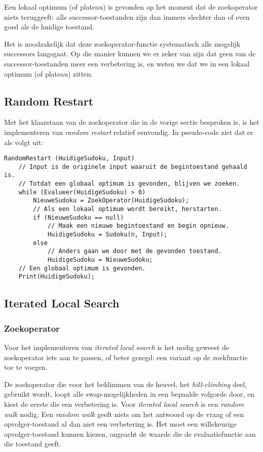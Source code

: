 \documentclass[]{report}
\begin{document}
Een lokaal optimum (of plateau) is gevonden op het moment dat de zoekoperator niets teruggeeft: alle successor-toestanden zijn dan immers slechter dan of even goed als de huidige toestand.

Het is noodzakelijk dat deze zoekoperator-functie systematisch alle mogelijk successors langsgaat. Op die manier kunnen we er zeker van zijn dat geen van de successor-toestanden meer een verbetering is, en weten we dat we in een lokaal optimum (of plateau) zitten. 

\subsection{Random Restart}
Met het klaarstaan van de zoekoperator die in de vorige sectie besproken is, is het implementeren van \textit{random restart} relatief eenvoudig. In pseudo-code ziet dat er als volgt uit:

\begin{minipage}{\textwidth}
\begin{lstlisting}
RandomRestart (HuidigeSudoku, Input)
	// Input is de originele input waaruit de begintoestand gehaald is.
	// Totdat een globaal optimum is gevonden, blijven we zoeken.
	while (Evalueer(HuidigeSudoku) > 0)
		NieuweSudoku = ZoekOperator(HuidigeSudoku);
		// Als een lokaal optimum wordt bereikt, herstarten.
		if (NieuweSudoku == null)
			// Maak een nieuwe begintoestand en begin opnieuw.
			HuidigeSudoku = Sudoku(n, Input);
		else
			// Anders gaan we door met de gevonden toestand. 
			HuidigeSudoku = NieuweSudoku;
	// Een globaal optimum is gevonden.
	Print(HuidigeSudoku);
\end{lstlisting}
\end{minipage}

\subsection{Iterated Local Search}
\subsubsection{Zoekoperator}
Voor het implementeren van \textit{iterated local search} is het nodig geweest de zoekoperator iets aan te passen, of beter gezegd: een variant op de zoekfunctie toe te voegen. 

De zoekoperator die voor het beklimmen van de heuvel, het \textit{hill-climbing} deel, gebruikt wordt, loopt alle swap-mogelijkheden in een bepaalde volgorde door, en kiest de eerste die een verbetering is. Voor \textit{iterated local search} is een \textit{random walk} nodig. Een \textit{random walk} geeft niets om het antwoord op de vraag of een opvolger-toestand al dan niet een verbetering is. Het moet een willekeurige opvolger-toestand kunnen kiezen, ongeacht de waarde die de evaluatiefunctie aan die toestand geeft. 
\end{document}
